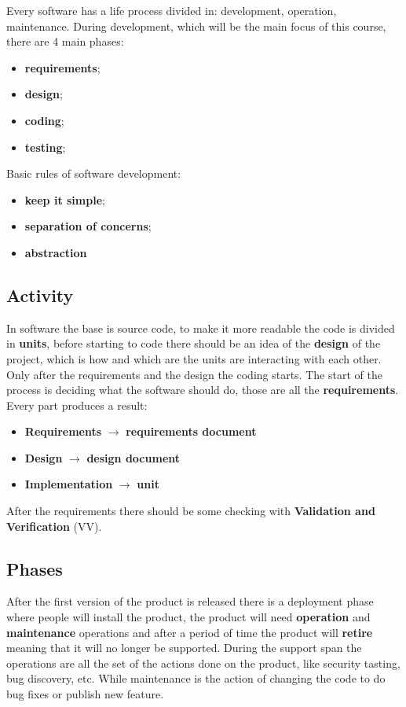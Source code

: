 \documentclass[12pt]{article}
\begin{document}
Every software has a life process divided in: development, operation, maintenance. During development, which will be the main focus of this course, there are 4 main phases:
\begin{itemize}
  \item \textbf{requirements};
  \item \textbf{design};
  \item \textbf{coding};
  \item \textbf{testing};
\end{itemize}
Basic rules of software development:
\begin{itemize}
  \item \textbf{keep it simple};
  \item \textbf{separation of concerns};
  \item \textbf{abstraction}
\end{itemize}


\subsection{Activity}
In software the base is source code, to make it more readable the code is divided in \textbf{units}, before starting to code there should be an idea of the \textbf{design} of the project, which is how and which are the units are interacting with each other. Only after the requirements and the design the coding starts. The start of the process is deciding what the software should do, those are all the \textbf{requirements}. Every part produces a result:
\begin{itemize}
  \item \textbf{Requirements} $\rightarrow$ \textbf{requirements document}
  \item \textbf{Design} $\rightarrow$ \textbf{design document}
  \item \textbf{Implementation} $\rightarrow$ \textbf{unit}
\end{itemize}
After the requirements there should be some checking with \textbf{Validation and Verification} (VV).

\subsection{Phases}
After the first version of the product is released there is a deployment phase where people will install the product, the product will need \textbf{operation} and \textbf{maintenance} operations and after a period of time the product will \textbf{retire} meaning that it will no longer be supported. During the support span the operations are all the set of the actions done on the product, like security tasting, bug discovery, etc. While maintenance is the action of changing the code to do bug fixes or publish new feature.
\end{document}
